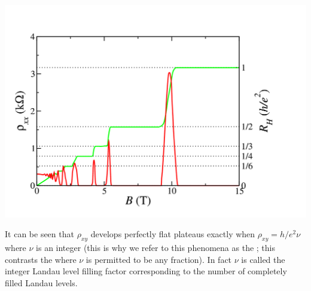 \documentclass{article}
\begin{document}
\begin{center}
    \hspace*{+3em}\includegraphics[width=\textwidth]{figures/quantum_hall_effect.png}
\end{center}

It can be seen that $\rho_{xy}$ develops perfectly flat plateaus exactly when $\rho_{xy} = h / e^2 \nu$ where $\nu$ is an integer (this is why we refer to this phenomena as the ; this contrasts the  where $\nu$ is permitted to be any fraction). In fact $\nu$ is called the integer Landau level filling factor corresponding to the number of completely filled Landau levels. \\
\end{document}
